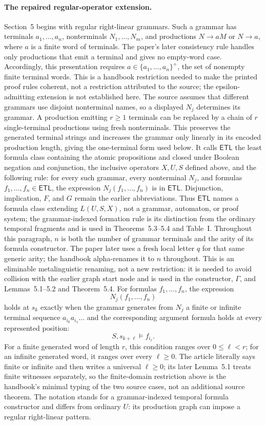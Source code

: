 \paragraph{The repaired regular-operator extension.}
Section~5 begins with regular right-linear grammars.  Such a grammar has
terminals \(a_1,\ldots,a_n\), nonterminals
\(N_1,\ldots,N_m\), and productions \(N\to aM\) or \(N\to a\), where
\(a\) is a finite word of terminals.  The paper's later consistency rule
handles only productions that emit a terminal and gives no empty-word case.
Accordingly, this presentation requires
\(a\in\{a_1,\ldots,a_n\}^{+}\), the set of nonempty finite terminal words.
This is a handbook restriction needed to make the printed proof rules coherent,
not a restriction attributed to the source; the epsilon-admitting extension is
not established here.  The source assumes that different grammars use disjoint
nonterminal names, so a displayed \(N_j\) determines its grammar.  A production
emitting \(r\ge1\) terminals can be replaced by a chain of \(r\)
single-terminal productions using fresh nonterminals.  This preserves the
generated terminal strings and increases the grammar only linearly in its
encoded production length, giving the one-terminal form used below.
It calls \(\mathsf{ETL}\) the least formula class containing the atomic
propositions and closed under Boolean negation and conjunction, the inclusive
operators \(X,U,S\) defined above, and the following rule: for every such
grammar, every nonterminal \(N_j\), and formulas
\(f_1,\ldots,f_n\in\mathsf{ETL}\), the expression
\(N_j(f_1,\ldots,f_n)\) is in \(\mathsf{ETL}\).  Disjunction, implication,
\(F\), and \(G\) remain the earlier abbreviations.  Thus \(\mathsf{ETL}\)
names a formula class extending \(L(U,S,X)\), not a grammar, automaton, or
proof system; the grammar-indexed formation rule is its distinction from the
ordinary temporal fragments and is used in Theorems~5.3--5.4 and Table~I.
Throughout this paragraph, \(n\) is both the number of grammar terminals and
the arity of its formula constructor.  The paper later uses a fresh local
letter \(q\) for that same generic arity; the handbook alpha-renames it to
\(n\) throughout.  This is an eliminable metalinguistic renaming, not a new
restriction: it is needed to avoid collision with the earlier graph start
node and is used in the constructor, \(\Gamma\), and Lemmas~5.1--5.2 and
Theorem~5.4.
For formulas \(f_1,\ldots,f_n\), the expression
\[
 N_j(f_1,\ldots,f_n)
\]
holds at \(s_k\) exactly when the grammar generates from \(N_j\) a finite or
infinite terminal sequence \(a_{i_0}a_{i_1}\ldots\) and the corresponding
argument formula holds at every represented position:
\[
 S,s_{k+\ell}\models f_{i_\ell}.
\]
For a finite generated word of length \(r\), this condition ranges over
\(0\le\ell<r\); for an infinite generated word, it ranges over every
\(\ell\ge0\).  The article literally says finite or infinite and then writes
a universal \(\ell\ge0\); its later Lemma~5.1 treats finite witnesses
separately, so the finite-domain restriction above is the handbook's minimal
typing of the two source cases, not an additional source theorem.  The
notation stands for a grammar-indexed temporal formula constructor and differs
from ordinary \(U\): its production graph can impose a regular right-linear
pattern.

